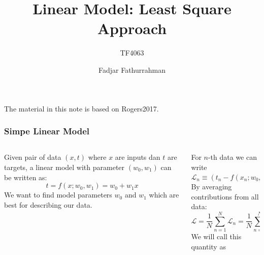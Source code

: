 \documentclass[english,10pt,aspectratio=169,fleqn]{beamer}
\begin{document}
\title{Linear Model: Least Square Approach}
\subtitle{TF4063}
\author{Fadjar Fathurrahman}
\date{}


\frame{\titlepage}

\begin{frame} %

The material in this note is based on Rogers2017.

\end{frame} %


\begin{frame} %
\frametitle{Simpe Linear Model}

\begin{columns}
  \begin{column}{0.5\textwidth}
  Given pair of data $(x,t)$ where $x$ are inputs dan $t$
  are targets, a linear model with parameter $(w_0, w_1)$ can
  be written as:
  \begin{equation}
  t = f(x; w_0, w_1) = w_0 + w_1 x
  \label{eq:model_linear_01}
  \end{equation}
  We want to find model parameters $w_0$ and $w_1$ which are best
  for describing our data.
  \end{column}
%
  \begin{column}{0.5\textwidth}
  For $n$-th data we can write
  \begin{equation}
  \mathcal{L}_n \equiv \left( t_n - f(x_n; w_0, w_1) \right)^2
  \end{equation}
  By averaging contributions from all data:
  \begin{equation}
  \mathcal{L} = \frac{1}{N} \sum_{n=1}^{N} \mathcal{L}_n =
  \frac{1}{N} \sum_{n=1}^{N} \left( t_n - f(x_n; w_0, w_1) \right)^2
  \label{eq:loss_function_01}
  \end{equation}
  We will call this quantity as 
  \end{column}
%
\end{columns}

\end{frame} %
\end{document}
